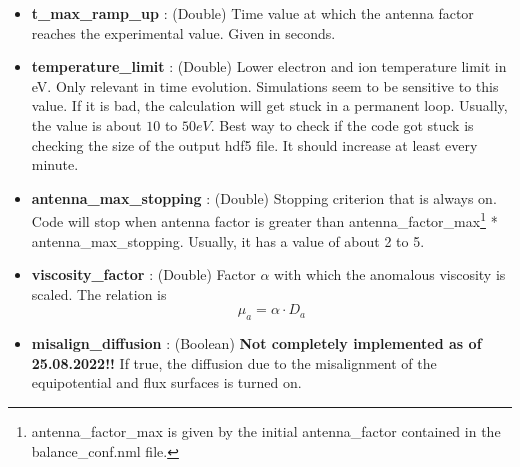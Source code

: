 \documentclass{article}
\begin{document}
\begin{itemize}
\begin{itemize}
		\item 2: the antenna factor reaches its experimental value at \texttt{t\_max\_ramp\_up}
		\item 3: steady state mode. Goes up to antenna factor max and stays there for $10\cdot t\_max\_ramp\_up$.
		\item 4: no RMP mode. Antenna factor is set to zero. Code stops when time is $10\cdot t\_max\_ramp\_up$.
	\end{itemize}
	\item \textbf{t\_max\_ramp\_up} : (Double) Time value at which the antenna factor reaches the experimental value. Given in seconds.
	\item \textbf{temperature\_limit} : (Double) Lower electron and ion temperature limit in eV. Only relevant in time evolution. Simulations seem to be sensitive to this value. If it is bad, the calculation will get stuck in a permanent loop. Usually, the value is about $10$ to $50eV$. Best way to check if the code got stuck is checking the size of the output hdf5 file. It should increase at least every minute.
	\item \textbf{antenna\_max\_stopping} : (Double) Stopping criterion that is always on. Code will stop when antenna factor is greater than antenna\_factor\_max\footnote{antenna\_factor\_max is given by the initial antenna\_factor contained in the balance\_conf.nml file.} * antenna\_max\_stopping. Usually, it has a value of about 2 to 5.
	\item \textbf{viscosity\_factor} : (Double) Factor $\alpha$ with which the anomalous viscosity is scaled. The relation is 
	\begin{equation}
		\mu_a = \alpha \cdot D_a
	\end{equation}
	\item \textbf{misalign\_diffusion} : (Boolean) \textbf{Not completely implemented as of 25.08.2022!!} If true, the diffusion due to the misalignment of the equipotential and flux surfaces is turned on.

\end{itemize}
\end{document}
